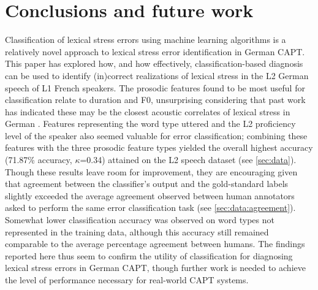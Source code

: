 \documentclass[a4paper]{article}
\begin{document}
		

	\section{Conclusions and future work}
	\label{sec:conc}
	
		Classification of lexical stress errors using machine learning algorithms is a relatively novel approach to lexical stress error identification in German CAPT.
		This paper has 
		explored  
		how, and how effectively, classification-based diagnosis can be used to identify (in)correct realizations of lexical stress in the L2 German speech of L1 French speakers. 
		The prosodic features found to be most useful for classification relate to duration and F0, unsurprising considering that past work has indicated these may be the closest acoustic correlates of lexical stress in German \cite{Dogil1999,Cutler2005}. 
		Features representing the word type uttered and the L2 proficiency level of the speaker also seemed valuable for error classification; combining these features with the three prosodic feature types yielded the overall highest accuracy (71.87\% accuracy, $\kappa$=0.34) attained on the L2 speech dataset (see \cref{sec:data}).
		Though these results leave room for improvement, they are encouraging given that agreement between the classifier's output and the gold-standard labels slightly exceeded the average agreement observed between human annotators asked to perform the same error classification task (see \cref{sec:data:agreement}).
		Somewhat lower classification accuracy was observed on word types not represented in the training data, although this accuracy still remained comparable to the average percentage agreement between humans.
		The findings reported here thus seem to confirm the utility of classification for diagnosing lexical stress errors in German CAPT, though further work is needed to achieve the level of performance necessary for real-world CAPT systems.
	
\end{document}
